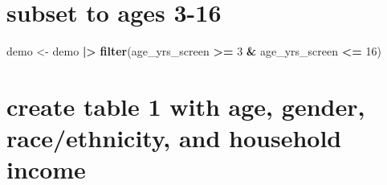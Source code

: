 \documentclass[
]{article}
\newenvironment{Shaded}{\begin{snugshade}}{\end{snugshade}}
\newcommand{\DecValTok}[1]{\textcolor[rgb]{0.00,0.00,0.81}{#1}}
\newcommand{\FunctionTok}[1]{\textcolor[rgb]{0.13,0.29,0.53}{\textbf{#1}}}
\newcommand{\NormalTok}[1]{#1}
\newcommand{\OtherTok}[1]{\textcolor[rgb]{0.56,0.35,0.01}{#1}}
\newcommand{\SpecialCharTok}[1]{\textcolor[rgb]{0.81,0.36,0.00}{\textbf{#1}}}
\begin{document}
\hypertarget{subset-to-ages-3-16}{%
\section{subset to ages 3-16}\label{subset-to-ages-3-16}}

\begin{Shaded}
\begin{Highlighting}[]
\NormalTok{demo }\OtherTok{\textless{}{-}}\NormalTok{ demo }\SpecialCharTok{|\textgreater{}} 
  \FunctionTok{filter}\NormalTok{(age\_yrs\_screen }\SpecialCharTok{\textgreater{}=} \DecValTok{3} \SpecialCharTok{\&}\NormalTok{ age\_yrs\_screen }\SpecialCharTok{\textless{}=} \DecValTok{16}\NormalTok{)}
\end{Highlighting}
\end{Shaded}

\hypertarget{create-table-1-with-age-gender-raceethnicity-and-household-income}{%
\section{create table 1 with age, gender, race/ethnicity, and household
income}\label{create-table-1-with-age-gender-raceethnicity-and-household-income}}
\end{document}
